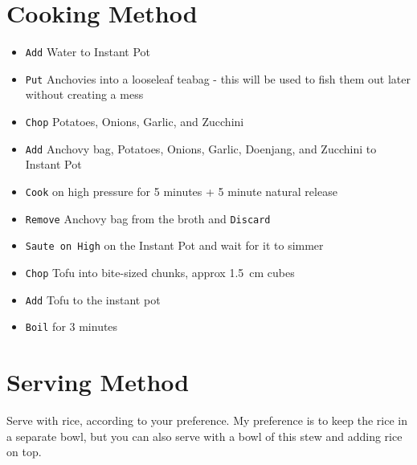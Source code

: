 \documentclass{article}
\begin{document}
\begin{multicols}{2}
\section{Cooking Method}
\begin{itemize}
	\item \verb|Add| Water to Instant Pot
	\item \verb|Put| Anchovies into a looseleaf teabag - this will be used to fish them out later without creating a mess
	\item \verb|Chop| Potatoes, Onions, Garlic, and Zucchini
	\item \verb|Add| Anchovy bag, Potatoes, Onions, Garlic, Doenjang, and Zucchini to Instant Pot
	\item \verb|Cook| on high pressure for 5 minutes + 5 minute natural release
	\item \verb|Remove| Anchovy bag from the broth and \verb|Discard|
	\item \verb|Saute on High| on the Instant Pot and wait for it to simmer
	\item \verb|Chop| Tofu into bite-sized chunks, approx \SI{1.5}{cm} cubes
	\item \verb|Add| Tofu to the instant pot
	\item \verb|Boil| for 3 minutes
\end{itemize}

\section{Serving Method}
Serve with rice, according to your preference. My preference is to keep the rice in a separate bowl, but you can also serve with a bowl of this stew and adding rice on top.



\end{multicols}
\end{document}
